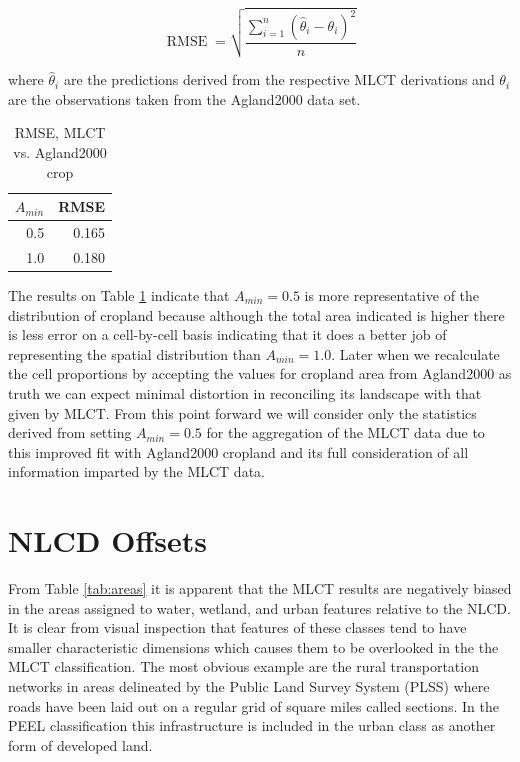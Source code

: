$$
\operatorname{RMSE}=\sqrt{\frac{\sum_{i=1}^{n}(\hat\theta_i-\theta_i )^2}{n}}
$$

where $\hat\theta_i$ are the predictions derived from the respective
MLCT derivations and $\theta_i$ are the observations taken from the
Agland2000 data set.





\begin{table}[ht]
\begin{center}
\begin{tabular}{rr}
  \hline
$A_{min}$ & RMSE \\ 
  \hline
0.5 & 0.165 \\ 
  1.0 & 0.180 \\ 
   \hline
\end{tabular}
\caption{RMSE, MLCT vs. Agland2000 crop}
\label{tab:rmse}
\end{center}
\end{table}
The results on Table \ref{tab:rmse} indicate that $A_{min}=0.5$ is
more representative of the distribution of cropland because although
the total area indicated is higher there is less error on a
cell-by-cell basis indicating that it does a better job of
representing the spatial distribution than $A_{min}=1.0$.  Later when
we recalculate the cell proportions by accepting the values for
cropland area from Agland2000 as truth we can expect minimal
distortion in reconciling its landscape with that given by MLCT.  From
this point forward we will consider only the statistics derived from
setting $A_{min}=0.5$ for the aggregation of the MLCT data due to this
improved fit with Agland2000 cropland and its full consideration of
all information imparted by the MLCT data.


\section{NLCD Offsets}
\label{nlcd_offsets}


From Table \ref{tab:areas} it is apparent that the MLCT results are
negatively biased in the areas assigned to water, wetland, and urban
features relative to the NLCD.  It is clear from visual inspection
that features of these classes tend to have smaller characteristic
dimensions which causes them to be overlooked in the the MLCT
classification.  The most obvious example are the rural transportation
networks in areas delineated by the Public Land Survey System (PLSS)
where roads have been laid out on a regular grid of square miles
called sections.  In the PEEL classification this infrastructure is
included in the urban class as another form of developed land.

